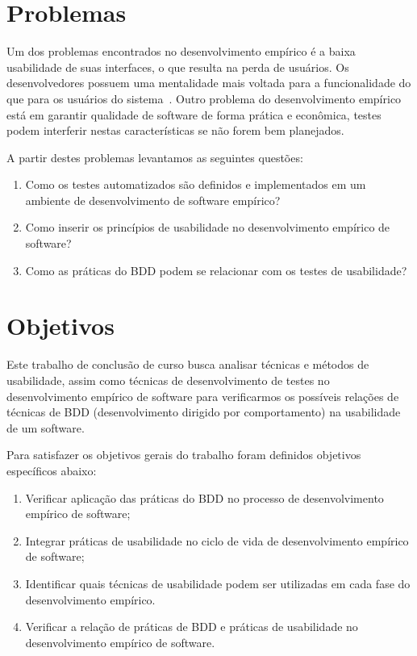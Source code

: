  

\section{Problemas}

Um dos problemas encontrados no desenvolvimento empírico é a baixa usabilidade de suas interfaces, o que resulta na perda de usuários. 
%
Os desenvolvedores possuem uma mentalidade mais voltada para a funcionalidade do que para os usuários do sistema~\cite{santos2012}. 
%
Outro problema do desenvolvimento empírico está em garantir qualidade de software de forma prática e econômica, testes podem interferir nestas características se não forem bem planejados.

A partir destes problemas levantamos as seguintes questões:
	
\begin{enumerate}
\item Como os testes automatizados são definidos e implementados em um ambiente de desenvolvimento de software empírico?
\item Como inserir os princípios de usabilidade no desenvolvimento empírico de software?
\item Como as práticas do BDD podem se relacionar com os testes de usabilidade?
\end{enumerate}

\section{Objetivos}
	 
Este trabalho de conclusão de curso busca analisar técnicas e métodos de usabilidade, assim como técnicas de desenvolvimento de testes no desenvolvimento empírico de software para verificarmos os possíveis relações de técnicas de BDD (desenvolvimento dirigido por comportamento) na usabilidade de um software.

Para satisfazer os objetivos gerais do trabalho foram definidos objetivos específicos abaixo:

\begin{enumerate}
\item Verificar aplicação das práticas do BDD no processo de desenvolvimento empírico de software;
\item Integrar práticas de usabilidade no ciclo de vida de desenvolvimento empírico de software;
\item Identificar quais técnicas de usabilidade  podem ser utilizadas em cada fase do desenvolvimento empírico.
\item Verificar a relação de práticas de BDD e práticas de usabilidade no desenvolvimento empírico de software.
\end{enumerate}

